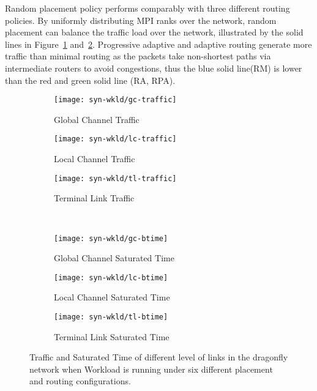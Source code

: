 Random placement policy performs comparably with three different routing policies.
By uniformly distributing MPI ranks over the network, 
random placement can balance the traffic load over the network,
illustrated by the solid lines in Figure~\ref{fig:synwkld-global-channel-traffic} and~\ref{fig:synwkld-local-channel-traffic}. 
Progressive adaptive and adaptive routing generate more traffic than minimal routing
as the packets take non-shortest paths via intermediate routers to avoid congestions, 
thus the blue solid line(RM) is lower than the red and green solid line (RA, RPA).



\begin{figure*}[t]
    \centering
    \begin{subfigure}[t]{0.32\textwidth}
        \centering
        \texttt{[image: syn-wkld/gc-traffic]}
        \caption{Global Channel Traffic}
        \label{fig:synwkld-global-channel-traffic}
    \end{subfigure}\hfill
    \hspace{1em}%
    \begin{subfigure}[t]{0.32\textwidth}
        \centering
        \texttt{[image: syn-wkld/lc-traffic]}
        \caption{Local Channel Traffic}
        \label{fig:synwkld-local-channel-traffic}
    \end{subfigure}\hfill
    \hspace{1em}%
    \begin{subfigure}[t]{0.32\textwidth}
        \centering
        \texttt{[image: syn-wkld/tl-traffic]}
        \caption{Terminal Link Traffic}
        \label{fig:synwkld-terminal-link-traffic}
    \end{subfigure}\\

    \begin{subfigure}[t]{0.32\textwidth}
        \centering
        \texttt{[image: syn-wkld/gc-btime]}
        \caption{Global Channel Saturated Time}
        \label{fig:synwkld-global-channel-stime}
    \end{subfigure}\hfill
     \hspace{1em}%
    \begin{subfigure}[t]{0.32\textwidth}
        \centering
        \texttt{[image: syn-wkld/lc-btime]}
        \caption{Local Channel Saturated Time}
        \label{fig:synwkld-local-channel-stime}
    \end{subfigure}\hfill
    \hspace{1em}%
    \begin{subfigure}[t]{0.32\textwidth}
        \centering
        \texttt{[image: syn-wkld/tl-btime]}
        \caption{Terminal Link Saturated Time}
        \label{fig:synwkld-terminal-link-stime}
    \end{subfigure}%
   \caption{Traffic and Saturated Time of different level of links in the dragonfly network when Workload  is running under six different placement and routing configurations.}
   \label{fig:synwkld-network-traffic-stime}
\end{figure*}


